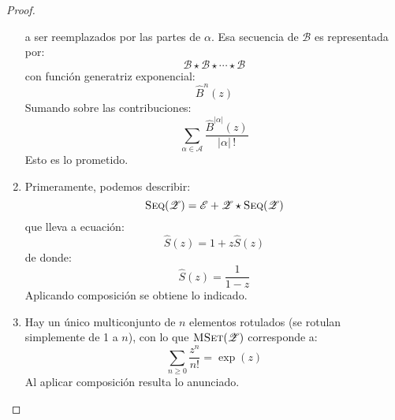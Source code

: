 \begin{proof}
\begin{enumerate}
      a ser reemplazados por las partes de \(\alpha\).
      Esa secuencia de \(\mathscr{B}\) es representada por:
      \begin{equation*}
        \mathscr{B}
          \star \mathscr{B}
          \star \dotsb
          \star \mathscr{B}
      \end{equation*}
      con función generatriz exponencial:
      \begin{equation*}
        \widehat{B}^n (z)
      \end{equation*}
      Sumando sobre las contribuciones:
      \begin{equation*}
        \sum_{\alpha \in \mathscr{A}}
           \frac{\widehat{B}^{\lvert \alpha \rvert}(z)}
                {\lvert \alpha \rvert \, !}
      \end{equation*}
      Esto es lo prometido.
    \item %
      Primeramente,
      podemos describir:
      \begin{equation*}
        \operatorname{\textsc{Seq}}(\mathscr{Z})
          = \mathscr{E} + \mathscr{Z} \star \operatorname{\textsc{Seq}}(\mathscr{Z})
      \end{equation*}
      que lleva a ecuación:
      \begin{equation*}
        \widehat{S}(z)
          = 1 + z \widehat{S}(z)
      \end{equation*}
      de donde:
      \begin{equation*}
        \widehat{S}(z)
          = \frac{1}{1 - z}
      \end{equation*}
      Aplicando composición se obtiene lo indicado.
    \item %
      Hay un único multiconjunto de \(n\) elementos rotulados
      (se rotulan simplemente de 1 a  \(n\)),
      con lo que \(\operatorname{\textsc{MSet}}(\mathscr{Z})\) corresponde a:
      \begin{equation*}
        \sum_{n \ge 0} \frac{z^n}{n!}
          = \exp(z)
      \end{equation*}
      Al aplicar composición resulta lo anunciado.


\end{enumerate}
\end{proof}
